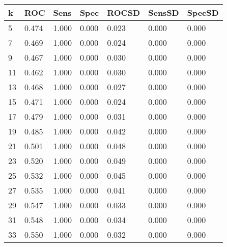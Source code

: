 {\footnotesize
	\begin{longtable}
		{l | l | l | l | l | l | l}
		\hline
		\textbf{k} & \textbf{ROC} & \textbf{Sens} & \textbf{Spec} & \textbf{ROCSD} & \textbf{SensSD} & \textbf{SpecSD} \\ \hline
		5          & 0.474        & 1.000         & 0.000         & 0.023          & 0.000           & 0.000           \\
		7          & 0.469        & 1.000         & 0.000         & 0.024          & 0.000           & 0.000           \\
		9          & 0.467        & 1.000         & 0.000         & 0.030          & 0.000           & 0.000           \\
		11         & 0.462        & 1.000         & 0.000         & 0.030          & 0.000           & 0.000           \\
		13         & 0.468        & 1.000         & 0.000         & 0.027          & 0.000           & 0.000           \\
		15         & 0.471        & 1.000         & 0.000         & 0.024          & 0.000           & 0.000           \\
		17         & 0.479        & 1.000         & 0.000         & 0.031          & 0.000           & 0.000           \\
		19         & 0.485        & 1.000         & 0.000         & 0.042          & 0.000           & 0.000           \\
		21         & 0.501        & 1.000         & 0.000         & 0.048          & 0.000           & 0.000           \\
		23         & 0.520        & 1.000         & 0.000         & 0.049          & 0.000           & 0.000           \\
		25         & 0.532        & 1.000         & 0.000         & 0.045          & 0.000           & 0.000           \\
		27         & 0.535        & 1.000         & 0.000         & 0.041          & 0.000           & 0.000           \\
		29         & 0.547        & 1.000         & 0.000         & 0.033          & 0.000           & 0.000           \\
		31         & 0.548        & 1.000         & 0.000         & 0.034          & 0.000           & 0.000           \\
		33         & 0.550        & 1.000         & 0.000         & 0.032          & 0.000           & 0.000           \\

\end{longtable}}
